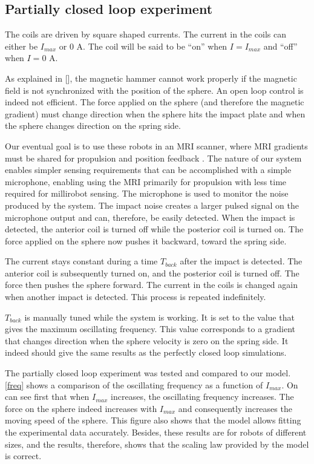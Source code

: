 \documentclass[letterpaper, 10 pt, conference]{ieeeconf}  %
\begin{document}
\subsection{Partially closed loop experiment}

The coils are driven by square shaped currents. The current in the coils can either be $I_{max}$ or 0 A. The coil will be said to be “on” when $I=I_{max}$ and “off” when $I=0$ A.\par
As explained in [], the magnetic hammer cannot work properly if the magnetic field is not synchronized with the position of the sphere. An open loop control is indeed not efficient. The force applied on the sphere (and therefore the magnetic gradient) must change direction when the sphere hits the impact plate and when the sphere changes direction on the spring side.\par
Our eventual goal is to use these robots in an MRI scanner, where MRI gradients must be shared for propulsion and position feedback \cite{578}. The nature of our system enables simpler sensing requirements that can be accomplished with a simple microphone, enabling using the MRI primarily for propulsion with less time required for millirobot sensing. The microphone is used to monitor the noise produced by the system. The impact noise creates a larger pulsed signal on the microphone output and can, therefore, be easily detected. When the impact is detected, the anterior coil is turned off while the posterior coil is turned on. The force applied on the sphere now pushes it backward, toward the spring side.\par
The current stays constant during a time $T_{back}$ after the impact is detected. The anterior coil is subsequently turned on, and the posterior coil is turned off. The force then pushes the sphere forward. The current in the coils is changed again when another impact is detected. This process is repeated indefinitely.\par
$T_{back}$ is manually tuned while the system is working. It is set to the value that gives the maximum oscillating frequency. This value corresponds to a gradient that changes direction when the sphere velocity is zero on the spring side. It indeed should give the same results as the perfectly closed loop simulations.\par
The partially closed loop experiment was tested and compared to our model. \ref{freq} shows a comparison of the oscillating frequency as a function of $I_{max}$. On can see first that when $I_{max}$ increases, the oscillating frequency increases. The force on the sphere indeed increases with $I_{max}$ and consequently increases the moving speed of the sphere.
This figure also shows that the model allows fitting the experimental data accurately. Besides, these results are for robots of different sizes, and the results, therefore, shows that the scaling law provided by the model is correct.
\end{document}
